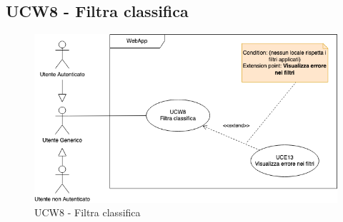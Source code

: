 \subsection{UCW8 - Filtra classifica}
\begin{figure}[!h]
\centering
    \includegraphics[scale=0.5]{UC_images/UCW8.png}
    \caption{UCW8 - Filtra classifica}
\end{figure}
